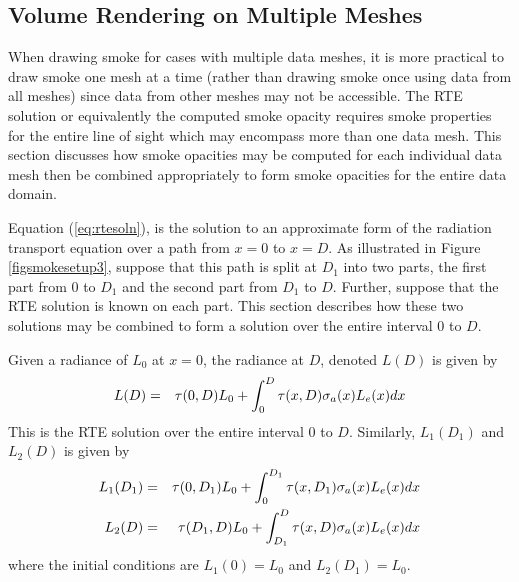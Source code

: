 %
%

\subsection{Volume Rendering on Multiple Meshes}
When drawing smoke for cases with multiple data meshes, it is more practical to draw smoke one mesh at a time (rather than drawing smoke once using data from all meshes) since data from other meshes may not be accessible.  The RTE solution or equivalently the computed smoke opacity requires smoke properties for the entire line of sight which may encompass more than one data mesh.  This section discusses how smoke opacities may be computed for each individual data mesh then be combined appropriately to form smoke opacities for the entire data domain.

Equation (\ref{eq:rtesoln}), is the solution to an approximate form of the radiation transport equation over a path
from $x=0$ to $x=D$.  As illustrated in Figure \ref{figsmokesetup3},
suppose that this path is split at $D_1$ into two parts, the first part from $0$ to $D_1$ and the second part from $D_1$ to $D$.
Further, suppose that the RTE solution is known on each part.
This section describes how these two solutions may be combined to form a solution
over the entire interval $0$ to $D$.

Given a radiance of $L_0$ at $x=0$, the radiance at $D$, denoted $L(D)$ is given by
\begin{eqnarray}
\label{eq:rtesoln2}
L(D)&=&\tau(0,D)L_0 + \int_0^D\tau(x,D)\sigma_a(x)L_e(x) dx
\end{eqnarray}
This is the RTE solution over the entire interval $0$ to $D$.
Similarly, $L_1(D_1)$ and $L_2(D)$ is given by
\begin{eqnarray*}
L_1(D_1)&=&\tau(0,D_1)L_0 + \int_0^{D_1}\tau(x,D_1)\sigma_a(x)L_e(x) dx\\
L_2(D)&=&\tau(D_1,D)L_0 + \int_{D_1}^{D}\tau(x,D)\sigma_a(x)L_e(x) dx
\end{eqnarray*}
where the initial conditions are $L_1(0)=L_0$ and $L_2(D_1)=L_0$.

